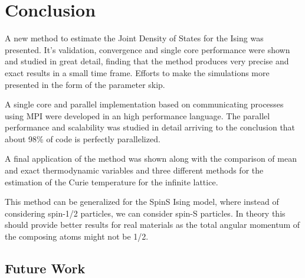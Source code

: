 \chapter{Conclusion}

	A new method to estimate the Joint Density of States for the Ising was presented. It's validation, convergence and single core performance were shown and studied in great detail, finding that the method produces very precise and exact results in a small time frame. Efforts to make the simulations more presented in the form of the parameter skip. 
	
	A single core and parallel implementation based on communicating processes using MPI were developed in an high performance language. The parallel performance and scalability was studied in detail arriving to the conclusion that about 98\% of code is perfectly parallelized.
	
	A final application of the method was shown along with the comparison of mean and exact thermodynamic variables and three different methods for the estimation of the Curie temperature for the infinite lattice.
	
	This method can be generalized for the SpinS Ising model, where instead of considering spin-1/2 particles, we can consider spin-S particles. In theory this should provide better results for real materials as the total angular momentum of the composing atoms might not be 1/2.
	
\section{Future Work}	
	